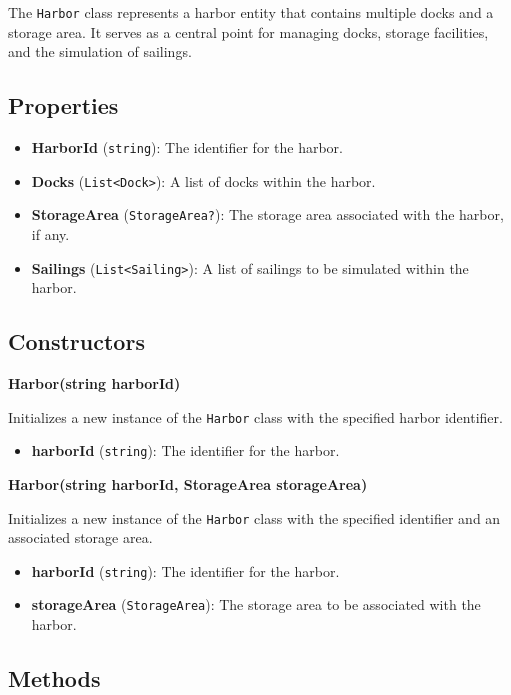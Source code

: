\documentclass[12pt]{article}
\begin{document}
The \texttt{Harbor} class represents a harbor entity that contains multiple docks and a storage area. It serves as a central point for managing docks, storage facilities, and the simulation of sailings.

\subsection*{Properties}

\begin{itemize}
    \item \textbf{HarborId} (\texttt{string}): The identifier for the harbor.
    \item \textbf{Docks} (\texttt{List<Dock>}): A list of docks within the harbor.
    \item \textbf{StorageArea} (\texttt{StorageArea?}): The storage area associated with the harbor, if any.
    \item \textbf{Sailings} (\texttt{List<Sailing>}): A list of sailings to be simulated within the harbor.
\end{itemize}

\subsection*{Constructors}

\textbf{Harbor(string harborId)}

Initializes a new instance of the \texttt{Harbor} class with the specified harbor identifier.

\begin{itemize}
    \item \textbf{harborId} (\texttt{string}): The identifier for the harbor.
\end{itemize}

\textbf{Harbor(string harborId, StorageArea storageArea)}

Initializes a new instance of the \texttt{Harbor} class with the specified identifier and an associated storage area.

\begin{itemize}
    \item \textbf{harborId} (\texttt{string}): The identifier for the harbor.
    \item \textbf{storageArea} (\texttt{StorageArea}): The storage area to be associated with the harbor.
\end{itemize}

\subsection*{Methods}
\end{document}
